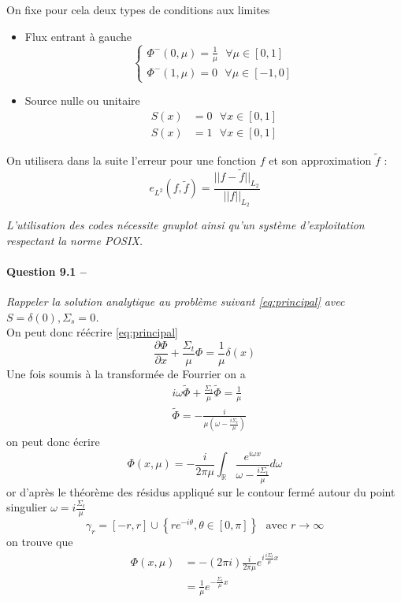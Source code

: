 \documentclass[11pt,a4paper]{article}
\newcommand{\dx}[1]{\dfrac{\partial #1}{\partial x}}
\newcommand{\norm}[1]{\big|\big|#1\big|\big|}
\newcommand{\question}[2]{\paragraph{Question #1 --}\hspace{-7pt}\textit{#2} \\}
\newcommand{\tphi}{\widetilde{\Phi}}
\begin{document}
On fixe pour cela deux types de conditions aux limites 
\begin{itemize}
\item Flux entrant à gauche
  \begin{equation}
    \begin{cases}
      \Phi^{-} (0, \mu) = \frac{1}{\mu}  ~~~ \forall \mu \in [0,1]\\
      \Phi^{-} (1, \mu) = 0 ~~~ \forall \mu \in [-1,0]
    \end{cases}
  \end{equation}
\item Source nulle ou unitaire
  \begin{align}
    S(x) &= 0 ~~~ \forall x \in [0,1] \\
    S(x) &= 1 ~~~ \forall x \in [0,1] 
  \end{align}
\end{itemize}	

On utilisera dans la suite l'erreur pour une fonction $f$ et son approximation $\tilde{f}$ : 
\begin{equation}
  e_{L^2}(f, \tilde{f}) = \frac{\norm{f-\tilde{f}}_{L_2}}{\norm{f}_{L_2}}
\end{equation}

\emph{L'utilisation des codes nécessite gnuplot ainsi qu'un système d'exploitation respectant la norme POSIX.}

\question{9.1}{Rappeler la solution analytique au problème suivant \autoref{eq:principal} avec $S=\delta(0), \Sigma_s=0$.}

On peut donc réécrire \autoref{eq:principal} 
\begin{equation}
  \dx{\Phi} + \frac{\Sigma_t}{\mu} \Phi = \frac{1}{\mu} \delta(x)
\end{equation}
Une fois soumis à la transformée de Fourrier on a 
\begin{align}
  &i \omega \tphi + \frac{\Sigma_t}{\mu} \tphi = \frac{1}{\mu} \\
  &\tphi = -\frac{i}{\mu\left(\omega - \frac{i \Sigma_t}{\mu}\right)}
\end{align}
on peut donc écrire 
\begin{equation}
  \Phi (x, \mu) = -\frac{i}{2\pi\mu} \int_{\mathbb{R}} \frac{e^{i\omega x}}{\omega - \frac{i \Sigma_t}{\mu}} d\omega 
\end{equation}
or d'après le théorème des résidus appliqué sur le contour fermé autour du point singulier $\omega = i\frac{\Sigma_t}{\mu}$
\begin{equation}
  \gamma_r = [-r,r]\cup\left\{r e^{-i \theta}, \theta \in [0, \pi] \right\} ~~~ \mbox{avec } r \to \infty
\end{equation}
on trouve que
\begin{align}
  \Phi (x, \mu) &= - (2 \pi i) \frac{i}{2\pi\mu} e^{i \frac{i \Sigma_t}{\mu} x} \\
                &= \frac{1}{\mu} e^{-\frac{\Sigma_t}{\mu} x} 
\end{align}
\end{document}
